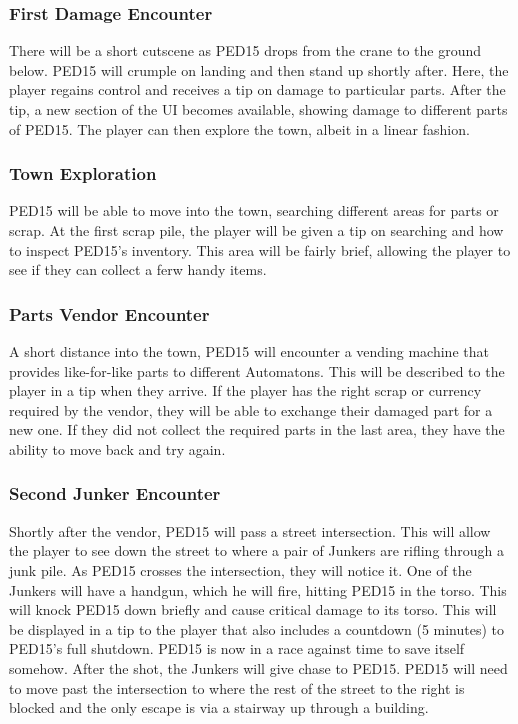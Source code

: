 \documentclass[journal]{IEEEtran}
\begin{document}
\subsubsection{First Damage Encounter}
There will be a short cutscene as PED15 drops from the crane to the ground below. PED15 will crumple on landing and then stand up shortly after. Here, the player regains control and receives a tip on damage to particular parts. After the tip, a new section of the UI becomes available, showing damage to different parts of PED15. The player can then explore the town, albeit in a linear fashion.
\subsubsection{Town Exploration}
PED15 will be able to move into the town, searching different areas for parts or scrap. At the first scrap pile, the player will be given a tip on searching and how to inspect PED15's inventory. This area will be fairly brief, allowing the player to see if they can collect a ferw handy items.
\subsubsection{Parts Vendor Encounter}
A short distance into the town, PED15 will encounter a vending machine that provides like-for-like parts to different Automatons. This will be described to the player in a tip when they arrive. If the player has the right scrap or currency required by the vendor, they will be able to exchange their damaged part for a new one. If they did not collect the required parts in the last area, they have the ability to move back and try again.
\subsubsection{Second Junker Encounter}
Shortly after the vendor, PED15 will pass a street intersection. This will allow the player to see down the street to where a pair of Junkers are rifling through a junk pile. As PED15 crosses the intersection, they will notice it. One of the Junkers will have a handgun, which he will fire, hitting PED15 in the torso. This will knock PED15 down briefly and cause critical damage to its torso. This will be displayed in a tip to the player that also includes a countdown (5 minutes) to PED15's full shutdown. PED15 is now in a race against time to save itself somehow. After the shot, the Junkers will give chase to PED15. PED15 will need to move past the intersection to where the rest of the street to the right is blocked and the only escape is via a stairway up through a building.
\end{document}
